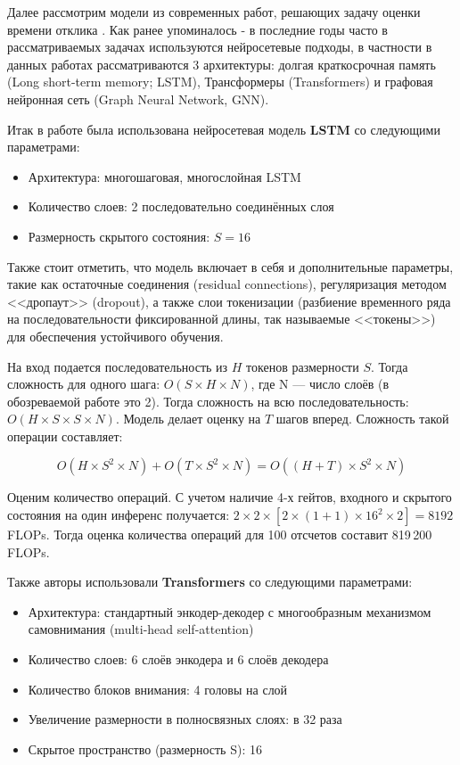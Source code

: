 Далее рассмотрим модели из современных работ, решающих задачу оценки времени отклика \cite{ge2022gnn, lstm_trans}. Как ранее упоминалось - в последние годы часто в рассматриваемых задачах используются нейросетевые подходы, в частности в данных работах рассматриваются 3 архитектуры: долгая краткосрочная память (Long short-term memory; LSTM), Трансформеры (Transformers) и графовая нейронная сеть (Graph Neural Network, GNN).

Итак в работе \cite{lstm_trans} была использована нейросетевая модель \textbf{LSTM} со следующими параметрами:

\begin{itemize}
	\item Архитектура:  многошаговая, многослойная LSTM
	\item Количество слоев: 2 последовательно соединённых слоя
	\item Размерность скрытого состояния: $S=16$
	
\end{itemize}

Также стоит отметить, что модель включает в себя и дополнительные параметры, такие как остаточные соединения (residual connections), регуляризация методом <<дропаут>> (dropout), а также слои токенизации (разбиение временного ряда на последовательности фиксированной длины, так называемые <<токены>>) для обеспечения устойчивого обучения.


На вход подается последовательность из $H$ токенов размерности $S$. Тогда сложность для одного шага: $O(S \times H \times N)$, где N — число слоёв (в обозреваемой работе это 2). Тогда сложность на всю последовательность: $O(H \times S \times S \times N)$. Модель делает оценку на $T$ шагов вперед. Сложность такой операции составляет:

\begin{equation}
	O(H \times S^2 \times N) + O(T \times S^2 \times N) = O((H+T) \times S^2 \times N)
\end{equation}

Оценим количество операций. С учетом наличие 4-х гейтов, входного и скрытого состояния на один инференс получается: $ 2 \times 2 \times [2 \times (1+1) \times 16^2  \times 2] = 8192$ FLOPs. Тогда оценка количества операций для 100 отсчетов составит 819\,200 FLOPs.

Также авторы \cite{lstm_trans} использовали \textbf{Transformers} со следующими параметрами:

\begin{itemize}
	\item Архитектура: стандартный энкодер-декодер с многообразным механизмом самовнимания (multi-head self-attention)
	\item Количество слоев: 6 слоёв энкодера и 6 слоёв декодера
	\item Количество блоков внимания: 4 головы на слой
	\item Увеличение размерности в полносвязных слоях: в 32 раза
	\item Скрытое пространство (размерность S): 16
	
\end{itemize}


